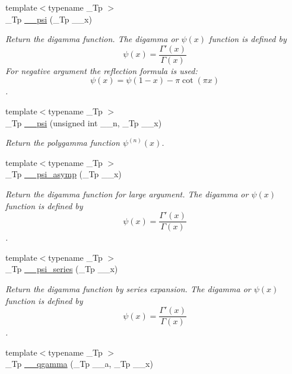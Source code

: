 \begin{DoxyCompactItemize}
{\footnotesize template$<$typename \+\_\+\+Tp $>$ }\\\+\_\+\+Tp \hyperlink{namespacestd_1_1____detail_ad7246a3ca90be800e6cc79c8e2360abd}{\+\_\+\+\_\+psi} (\+\_\+\+Tp \+\_\+\+\_\+x)
\begin{DoxyCompactList}\small\item\em Return the digamma function. The digamma or $ \psi(x) $ function is defined by \[ \psi(x) = \frac{\Gamma'(x)}{\Gamma(x)} \] For negative argument the reflection formula is used\+: \[ \psi(x) = \psi(1-x) - \pi \cot(\pi x) \]. \end{DoxyCompactList}\item 
{\footnotesize template$<$typename \+\_\+\+Tp $>$ }\\\+\_\+\+Tp \hyperlink{namespacestd_1_1____detail_a96d6b8301ca54615364a53665b347f6c}{\+\_\+\+\_\+psi} (unsigned int \+\_\+\+\_\+n, \+\_\+\+Tp \+\_\+\+\_\+x)
\begin{DoxyCompactList}\small\item\em Return the polygamma function $ \psi^{(n)}(x) $. \end{DoxyCompactList}\item 
{\footnotesize template$<$typename \+\_\+\+Tp $>$ }\\\+\_\+\+Tp \hyperlink{namespacestd_1_1____detail_a2557b5d815b6667bc9228c1e8a2a16ae}{\+\_\+\+\_\+psi\+\_\+asymp} (\+\_\+\+Tp \+\_\+\+\_\+x)
\begin{DoxyCompactList}\small\item\em Return the digamma function for large argument. The digamma or $ \psi(x) $ function is defined by \[ \psi(x) = \frac{\Gamma'(x)}{\Gamma(x)} \]. \end{DoxyCompactList}\item 
{\footnotesize template$<$typename \+\_\+\+Tp $>$ }\\\+\_\+\+Tp \hyperlink{namespacestd_1_1____detail_a378e78e1c3c08b8f146acf32a26e831a}{\+\_\+\+\_\+psi\+\_\+series} (\+\_\+\+Tp \+\_\+\+\_\+x)
\begin{DoxyCompactList}\small\item\em Return the digamma function by series expansion. The digamma or $ \psi(x) $ function is defined by \[ \psi(x) = \frac{\Gamma'(x)}{\Gamma(x)} \]. \end{DoxyCompactList}\item 
{\footnotesize template$<$typename \+\_\+\+Tp $>$ }\\\+\_\+\+Tp \hyperlink{namespacestd_1_1____detail_acaac94504608c15edb7d96884ac1dc23}{\+\_\+\+\_\+qgamma} (\+\_\+\+Tp \+\_\+\+\_\+a, \+\_\+\+Tp \+\_\+\+\_\+x)

\end{DoxyCompactItemize}
